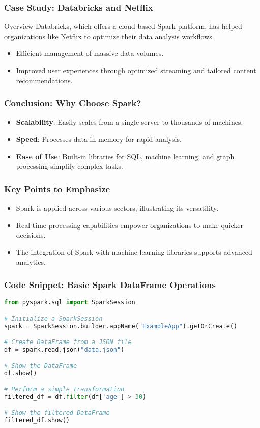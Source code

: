 \documentclass[aspectratio=169]{beamer}
\begin{document}
\begin{frame}[fragile]
  \frametitle{Case Study: Databricks and Netflix}
  \begin{block}{Overview}
    Databricks, which offers a cloud-based Spark platform, has helped organizations like Netflix to optimize their data analysis workflows.
    \begin{itemize}
      \item Efficient management of massive data volumes.
      \item Improved user experiences through optimized streaming and tailored content recommendations.
    \end{itemize}
  \end{block}
\end{frame}

\begin{frame}[fragile]
  \frametitle{Conclusion: Why Choose Spark?}
  \begin{itemize}
    \item \textbf{Scalability}: Easily scales from a single server to thousands of machines.
    \item \textbf{Speed}: Processes data in-memory for rapid analysis.
    \item \textbf{Ease of Use}: Built-in libraries for SQL, machine learning, and graph processing simplify complex tasks.
  \end{itemize}
\end{frame}

\begin{frame}[fragile]
  \frametitle{Key Points to Emphasize}
  \begin{itemize}
    \item Spark is applied across various sectors, illustrating its versatility.
    \item Real-time processing capabilities empower organizations to make quicker decisions.
    \item The integration of Spark with machine learning libraries supports advanced analytics.
  \end{itemize}
\end{frame}

\begin{frame}[fragile]
  \frametitle{Code Snippet: Basic Spark DataFrame Operations}
  \begin{lstlisting}[language=Python]
from pyspark.sql import SparkSession

# Initialize a SparkSession
spark = SparkSession.builder.appName("ExampleApp").getOrCreate()

# Create DataFrame from a JSON file
df = spark.read.json("data.json")

# Show the DataFrame
df.show()

# Perform a simple transformation
filtered_df = df.filter(df['age'] > 30)

# Show the filtered DataFrame
filtered_df.show()
  \end{lstlisting}
\end{frame}
\end{document}
